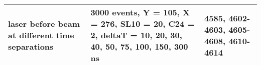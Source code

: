 \begin{landscape}
\begin{longtable}{|p{6cm}|p{10cm}|p{4cm}|}
laser before beam at different time separations & 3000 events, \newline  Y = 105, X = 276,  \newline SL10 = 20, C24 = 2,  \newline deltaT = 10, 20, 30, 40, 50, 75, 100, 150, 300 ns  & 4585, 4602-4603, 4605-4608, 4610-4614\\ \hline
\end{longtable}



\end{landscape}

